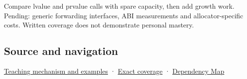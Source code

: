 Compare lvalue and prvalue calls with spare capacity, then add growth work. Pending: generic forwarding interfaces, ABI measurements and allocator-specific costs. Written coverage does not demonstrate personal mastery.

\subsection{Source and navigation}\label{appendix-d5908f75721f-source-and-navigation}

\hyperref[01-foundations-i-ch003-a-value-crosses-the-function-boundary]{Teaching mechanism and examples} · \hyperref[appendix-fd090d982a15-m009---parts-127-147]{Exact coverage} · \hyperref[appendix-4ad47bdd269a]{Dependency Map}
